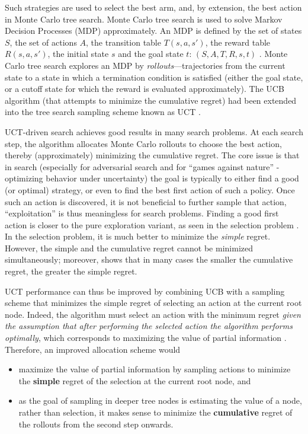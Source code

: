 \documentclass{article}
\begin{document}
Such strategies are used to select the best arm, and, by extension,
the best action in Monte Carlo tree search. Monte Carlo tree search is
used to solve Markov Decision Processes (MDP) approximately. An MDP is
defined by the set of states $S$, the set of actions $A$, the
transition table $T(s, a, s')$, the reward table $R(s, a, s')$, the
initial state $s$ and the goal state $t$: $(S, A, T, R, s, t)$
\cite{Russell.aima}.  Monte Carlo tree search explores an MDP by
\emph{rollouts}---trajectories from the current state to a state in
which a termination condition is satisfied (either the goal state, or
a cutoff state for which the reward is evaluated
approximately). The UCB algorithm (that attempts to minimize the cumulative regret)
\cite{Auer.ucb} had been extended into the tree search sampling scheme
known as UCT \cite{Kocsis.uct}.

UCT-driven search achieves good results in many search problems. At each
search step, the algorithm allocates Monte Carlo rollouts to choose
the best action, thereby (approximately) minimizing the cumulative regret. 
The core issue is that in search (especially for adversarial search
and for ``games against nature'' - optimizing behavior under uncertainty) the goal is typically
to either find a good (or optimal) strategy, or even to find the best first
action of such a policy. Once such an action is discovered, it is not beneficial
to further sample that action, ``exploitation'' is thus meaningless for
search problems. Finding a good first action is closer to the pure exploration
variant, as seen in the selection problem \cite{Bubeck.pure,TolpinShimony.blinkered}. In the selection
problem, it is much better to minimize the {\em simple} regret.
However, the simple and the cumulative regret cannot be minimized simultaneously;
moreover, \cite{Bubeck.pure} shows that in many cases the smaller the
cumulative regret, the greater the simple regret.


UCT performance can thus be improved by combining UCB with a sampling
scheme that minimizes the simple regret of selecting an action at the
current root node. Indeed, the algorithm must select an action with
the minimum regret \emph{given the assumption that after performing the selected action
the algorithm performs optimally}, which corresponds to maximizing the
value of partial information \cite{Russell.aima}. Therefore, an
improved allocation scheme would
\begin{itemize}
\item maximize the value of partial
information by sampling actions to
minimize the \textbf{simple} regret
of the selection at the current root node, and
\item as the goal of sampling in deeper tree nodes is estimating the value of
a node, rather than selection, it makes sense to
minimize the \textbf{cumulative} regret of the rollouts from the second
step onwards. 
\end{itemize}
\end{document}
